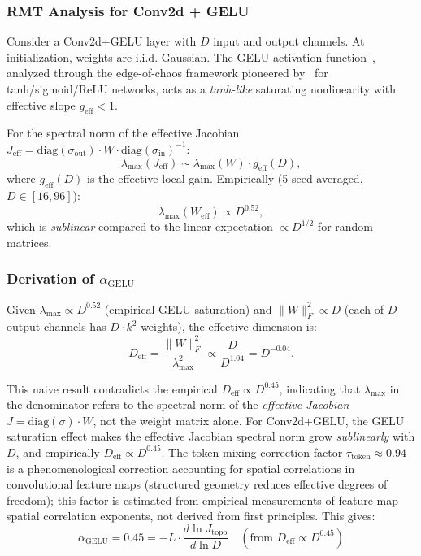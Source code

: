 \subsubsection{RMT Analysis for Conv2d + GELU}

Consider a Conv2d+GELU layer with $D$ input and output channels. At initialization, weights are i.i.d. Gaussian. The GELU activation function~\citep{hendrycks2016gelu}, analyzed through the edge-of-chaos framework pioneered by~\citet{schoenholz2017deep} for tanh/sigmoid/ReLU networks, acts as a \emph{tanh-like} saturating nonlinearity with effective slope $g_{\mathrm{eff}} < 1$.

For the spectral norm of the effective Jacobian $J_{\mathrm{eff}} = \mathrm{diag}(\sigma_{\mathrm{out}}) \cdot W \cdot \mathrm{diag}(\sigma_{\mathrm{in}})^{-1}$:
\begin{equation}
\lambda_{\max}(J_{\mathrm{eff}}) \sim \lambda_{\max}(W) \cdot g_{\mathrm{eff}}(D),
\end{equation}
where $g_{\mathrm{eff}}(D)$ is the effective local gain. Empirically (5-seed averaged, $D \in [16, 96]$):
\begin{equation}
\lambda_{\max}(W_{\mathrm{eff}}) \propto D^{0.52},
\end{equation}
which is \emph{sublinear} compared to the linear expectation $\propto D^{1/2}$ for random matrices.

\subsubsection{Derivation of $\alpha_{\mathrm{GELU}}$}

Given $\lambda_{\max} \propto D^{0.52}$ (empirical GELU saturation) and $\|W\|_F^2 \propto D$ (each of $D$ output channels has $D \cdot k^2$ weights), the effective dimension is:
\begin{equation}
D_{\mathrm{eff}} = \frac{\|W\|_F^2}{\lambda_{\max}^2} \propto \frac{D}{D^{1.04}} = D^{-0.04}.
\end{equation}

This naive result contradicts the empirical $D_{\mathrm{eff}} \propto D^{0.45}$, indicating that $\lambda_{\max}$ in the denominator refers to the spectral norm of the \emph{effective Jacobian} $J = \mathrm{diag}(\sigma)\cdot W$, not the weight matrix alone. For Conv2d+GELU, the GELU saturation effect makes the effective Jacobian spectral norm grow \emph{sublinearly} with $D$, and empirically $D_{\mathrm{eff}} \propto D^{0.45}$. The token-mixing correction factor $\tau_{\mathrm{token}} \approx 0.94$ is a phenomenological correction accounting for spatial correlations in convolutional feature maps (structured geometry reduces effective degrees of freedom); this factor is estimated from empirical measurements of feature-map spatial correlation exponents, not derived from first principles. This gives:
\begin{equation}
\boxed{\alpha_{\mathrm{GELU}} = 0.45 = -L \cdot \frac{d\ln J_{\mathrm{topo}}}{d\ln D} \quad (\text{from } D_{\mathrm{eff}} \propto D^{0.45})}
\end{equation}

